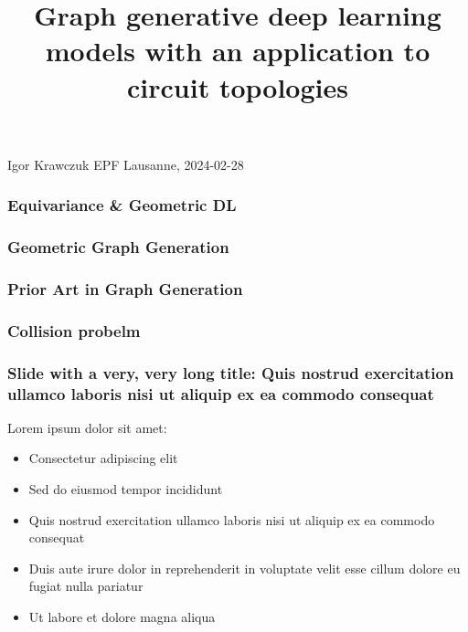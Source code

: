 \documentclass[11pt,xcolor={dvipsnames},hyperref={pdftex,pdfpagemode=UseNone,hidelinks,pdfdisplaydoctitle=true},usepdftitle=false]{beamer}
\begin{document}
\title{\justifying Graph generative deep learning models with an application to circuit topologies}
\information%
{Igor Krawczuk}%
{EPF Lausanne,  2024-02-28}
\frame{\titlepage}




\begin{frame}
  \frametitle{Equivariance \& Geometric DL}
\end{frame}
\begin{frame}[t]
  \frametitle{Geometric Graph Generation}
  
\end{frame}

\begin{frame}[t]
  \frametitle{Prior Art in Graph Generation}
  
\end{frame}

\begin{frame}[t]
  \frametitle{Collision probelm}
  
\end{frame}


\begin{frame}
\frametitle{Slide with a very, very long title: Quis nostrud exercitation ullamco laboris nisi ut aliquip ex ea commodo consequat}
Lorem ipsum dolor sit amet:
\begin{itemize}
\item Consectetur adipiscing elit
\item Sed do eiusmod tempor incididunt
\item Quis nostrud exercitation ullamco laboris nisi ut aliquip ex ea commodo consequat
\item Duis aute irure dolor in reprehenderit in voluptate velit esse cillum dolore eu fugiat nulla pariatur
\item Ut labore et dolore magna aliqua
\end{itemize}
\end{frame}
\end{document}
